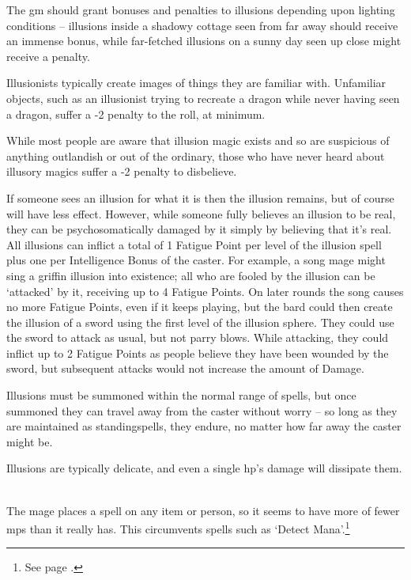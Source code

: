 \begin{multicols}{2}
The \gls{gm} should grant bonuses and penalties to illusions depending upon lighting conditions -- illusions inside a shadowy cottage seen from far away should receive an immense bonus, while far-fetched illusions on a sunny day seen up close might receive a penalty.

Illusionists typically create images of things they are familiar with. Unfamiliar objects, such as an illusionist trying to recreate a dragon while never having seen a dragon, suffer a -2 penalty to the roll, at minimum.

While most people are aware that illusion magic exists and so are suspicious of anything outlandish or out of the ordinary, those who have never heard about illusory magics suffer a -2 penalty to disbelieve.

If someone sees an illusion for what it is then the illusion remains, but of course will have less effect. However, while someone fully believes an illusion to be real, they can be psychosomatically damaged by it simply by believing that it's real. All illusions can inflict a total of 1 Fatigue Point per level of the illusion spell plus one per Intelligence Bonus of the caster. For example, a song mage might sing a griffin illusion into existence; all who are fooled by the illusion can be `attacked' by it, receiving up to 4 Fatigue Points. On later \glspl{round} the song causes no more Fatigue Points, even if it keeps playing, but the bard could then create the illusion of a sword using the first level of the illusion sphere. They could use the sword to attack as usual, but not parry blows. While attacking, they could inflict up to 2 Fatigue Points as people believe they have been wounded by the sword, but subsequent attacks would not increase the amount of Damage.

Illusions must be summoned within the normal range of spells, but once summoned they can travel away from the caster without worry -- so long as they are maintained as \glspl{standingspell}, they endure, no matter how far away the caster might be.

Illusions are typically delicate, and even a single \gls{hp}'s damage will dissipate them.

\spelllevel

\\
The mage places a spell on any item or person, so it seems to have more of fewer \glspl{mp} than it really has.
This circumvents spells such as `Detect Mana'.\footnote{See page \pageref{detectmagic}.}


\end{multicols}
